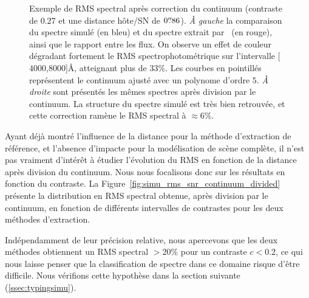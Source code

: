 \documentclass[../main/main.tex]{subfiles}
\begin{document}
\begin{figure}[ht]
  \centering
  \caption[Exemple de RMS spectral pour une simulation après correction
  du continuum.]{Exemple de RMS spectral après
    correction du continuum (contraste de $0.27$
    et une distance hôte/SN de $0\overset{\prime\prime}{.}86$). \emph{À gauche} la comparaison du spectre simulé (en bleu) et du spectre
    extrait par \hypergal\ (en rouge), ainsi que le rapport entre les
    flux. On observe un effet de
    couleur dégradant fortement le RMS spectrophotométrique sur
    l'intervalle [$4000$,$8000$]\AA, atteignant plus de $33\%$. Les
    courbes en pointillés représentent le continuum ajusté avec un
    polynome d'ordre $5$. \emph{À droite} sont présentés les mêmes
    spectres après division par le continuum. La
    structure du spectre simulé est très bien retrouvée, et cette
    correction ramène le RMS spectral à $\approx6\%$.}
  \label{fig:continuumcorrection_ex}
\end{figure}

Ayant déjà montré l'influence de la distance pour la méthode
d'extraction de référence, et l'absence d'impacte pour la modélisation
de scène complète, il n'est pas vraiment d'intérêt à étudier
l'évolution du RMS en fonction de la distance après division du
continuum.
Nous nous focalisons donc
sur les résultats en fonction du contraste. La
Figure~\ref{fig:simu_rms_snr_continuum_divided} présente la
distribution en RMS spectral obtenue, après division par le continuum, en fonction de différents
intervalles de contrastes pour les deux méthodes d'extraction.

Indépendamment de leur précision relative, nous apercevons que les deux méthodes
obtiennent un RMS spectral $>20\%$ pour un contraste $c<0.2$, ce qui
nous laisse penser que la classification de spectre dans ce domaine
risque d'être difficile. Nous vérifions cette hypothèse dans la section
suivante (\ref{ssec:typingsimu}).
\end{document}

